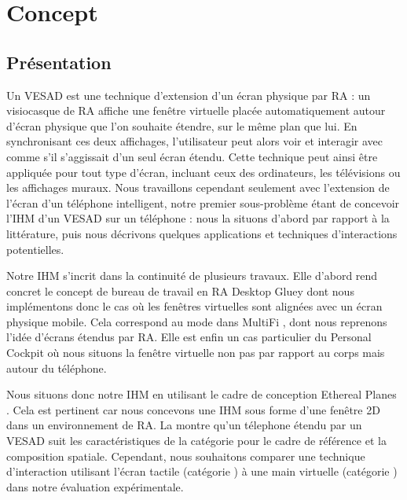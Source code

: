 \chapter{Concept}
\label{ch:concept}

\section{Présentation}
\label{sec:concept_introduction}

Un VESAD est une technique d'extension d'un écran physique par RA : un visiocasque de RA affiche une fenêtre virtuelle placée automatiquement autour d'écran physique que l'on souhaite étendre, sur le même plan que lui. En synchronisant ces deux affichages, l'utilisateur peut alors voir et interagir avec comme s'il s'aggissait d'un seul écran étendu. Cette technique peut ainsi être appliquée pour tout type d'écran, incluant ceux des ordinateurs, les télévisions ou les affichages muraux. Nous travaillons cependant seulement avec l'extension de l'écran d'un téléphone intelligent, notre premier sous-problème étant de concevoir l'IHM d'un VESAD sur un téléphone : nous la situons d'abord par rapport à la littérature, puis nous décrivons quelques applications et techniques d'interactions potentielles.

Notre IHM s'incrit dans la continuité de plusieurs travaux. Elle d'abord rend concret le concept de bureau de travail en RA Desktop Gluey \citep{Serrano2015a} dont nous implémentons donc le cas où les fenêtres virtuelles sont alignées avec un écran physique mobile. Cela correspond au mode  dans MultiFi \citep{Grubert2015}, dont nous reprenons l'idée d'écrans étendus par RA. Elle est enfin un cas particulier du Personal Cockpit \citep{Ens2014} où nous situons la fenêtre virtuelle non pas par rapport au corps mais autour du téléphone.

Nous situons donc notre IHM en utilisant le cadre de conception Ethereal Planes \citep{Ens2014a}. Cela est pertinent car nous concevons une IHM sous forme d'une fenêtre 2D dans un environnement de RA. La  montre qu'un télephone étendu par un VESAD suit les caractéristiques de la catégorie  pour le cadre de référence et la composition spatiale. Cependant, nous souhaitons comparer une technique d'interaction utilisant l'écran tactile (catégorie ) à une main virtuelle (catégorie ) dans notre évaluation expérimentale.

